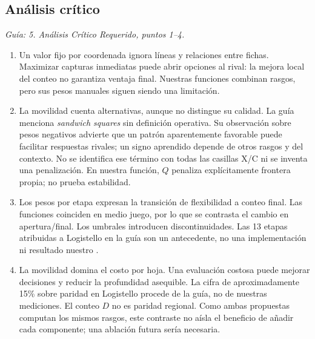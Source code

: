 \subsection{Análisis crítico}
\textit{Guía: 5. Análisis Crítico Requerido, puntos 1--4.}
\begin{enumerate}
\item Un valor fijo por coordenada ignora líneas y relaciones entre fichas. Maximizar capturas inmediatas puede abrir opciones al rival: la mejora local del conteo no garantiza ventaja final. Nuestras funciones combinan rasgos, pero sus pesos manuales siguen siendo una limitación.
\item La movilidad cuenta alternativas, aunque no distingue su calidad. La guía menciona \emph{sandwich squares} sin definición operativa. Su observación sobre pesos negativos advierte que un patrón aparentemente favorable puede facilitar respuestas rivales; un signo aprendido depende de otros rasgos y del contexto. No se identifica ese término con todas las casillas X/C ni se inventa una penalización. En nuestra función, $Q$ penaliza explícitamente frontera propia; no prueba estabilidad.
\item Los pesos por etapa expresan la transición de flexibilidad a conteo final. Las funciones coinciden en medio juego, por lo que se contrasta el cambio en apertura/final. Los umbrales introducen discontinuidades. Las 13 etapas atribuidas a Logistello en la guía son un antecedente, no una implementación ni resultado nuestro \cite{othello_guia}.
\item La movilidad domina el costo por hoja. Una evaluación costosa puede mejorar decisiones y reducir la profundidad asequible. La cifra de aproximadamente 15\% sobre paridad en Logistello procede de la guía, no de nuestras mediciones. El conteo $D$ no es paridad regional. Como ambas propuestas computan los mismos rasgos, este contraste no aísla el beneficio de añadir cada componente; una ablación futura sería necesaria.
\end{enumerate}
